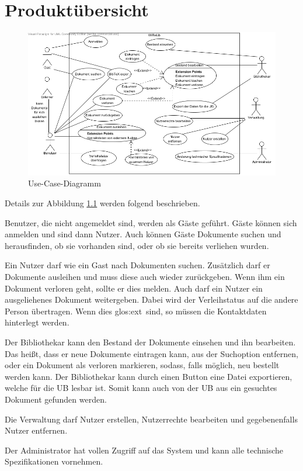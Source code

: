 \chapter{Produktübersicht}

\begin{figure}[h]
\centering
\includegraphics[width=0.8\linewidth]{bilder/use-case.png}
\caption[Use-Case-Diagramm]{Use-Case-Diagramm}
\label{use-case}
\end{figure}

Details zur Abbildung \ref{use-case}   werden folgend beschrieben.

Benutzer, die nicht angemeldet sind, werden als Gäste geführt.
Gäste können sich anmelden und sind dann Nutzer.
Auch können Gäste Dokumente suchen und herausfinden, ob sie vorhanden sind, oder ob sie bereits verliehen wurden.

Ein Nutzer darf wie ein Gast nach Dokumenten suchen.
Zusätzlich darf er Dokumente ausleihen und muss diese auch wieder zurückgeben.
Wenn ihm ein Dokument verloren geht, sollte er dies melden.
Auch darf ein Nutzer ein ausgeliehenes Dokument weitergeben.
Dabei wird der Verleihstatus auf die andere Person übertragen.
Wenn dies \gls{glos:ext}\ sind, so müssen die Kontaktdaten hinterlegt werden.

Der Bibliothekar kann den Bestand der Dokumente einsehen und ihn bearbeiten.
Das heißt, dass er neue Dokumente eintragen kann, aus der Suchoption entfernen, oder ein Dokument als verloren markieren, sodass, falls möglich, neu bestellt werden kann.
Der Bibliothekar kann durch einen Button eine Datei exportieren, welche für die \gls{UB} lesbar ist.
Somit kann auch von der \gls{UB} aus ein gesuchtes Dokument gefunden werden.

Die Verwaltung darf Nutzer erstellen, Nutzerrechte bearbeiten und gegebenenfalls Nutzer entfernen.

Der Administrator hat vollen Zugriff auf das System und kann alle technische Spezifikationen vornehmen.

